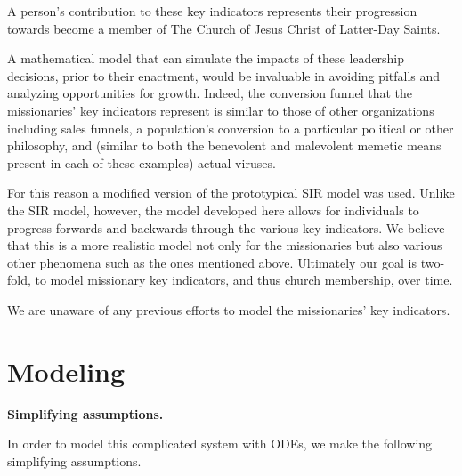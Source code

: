 \documentclass[11pt]{amsart}
\begin{document}
A person's contribution to these key indicators represents their progression towards become a member of The Church of Jesus Christ of Latter-Day Saints.

A mathematical model that can simulate the impacts of these leadership decisions, prior to their enactment, would be invaluable in avoiding pitfalls and analyzing opportunities for growth. Indeed, the conversion funnel that the missionaries' key indicators represent is similar to those of other organizations including sales funnels, a population's conversion to a particular political or other philosophy, and (similar to both the benevolent and malevolent memetic means present in each of these examples) actual viruses.

For this reason a modified version of the prototypical SIR model was used. Unlike the SIR model, however, the model developed here allows for individuals to progress forwards and backwards through the various key indicators. We believe that this is a more realistic model not only for the missionaries but also various other phenomena such as the ones mentioned above. Ultimately our goal is two-fold, to model missionary key indicators, and thus church membership, over time. 

We are unaware of any previous efforts to model the missionaries' key indicators.

\section{Modeling}

\begin{center}
    \textbf{Simplifying assumptions.}
\end{center}

In order to model this complicated system with ODEs, we make the following simplifying assumptions.
\end{document}
